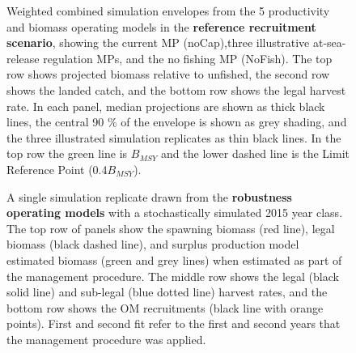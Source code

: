\documentclass[11pt]{book}
\begin{document}
\begin{landscape}
\begin{figure}[htb]
{}

\caption{Weighted combined simulation envelopes from the 5 productivity and biomass operating models in the \textbf{reference recruitment scenario}, showing the current MP (noCap),three illustrative at-sea-release regulation MPs, and the no fishing MP (NoFish). The top row shows projected biomass relative to unfished, the second row shows the landed catch, and the bottom row shows the legal harvest rate. In each panel, median projections are shown as thick black lines, the central 90 \% of the envelope is shown as grey shading, and the three illustrated simulation replicates as thin black lines. In the top row the green line is $B_{MSY}$ and the lower dashed line is the Limit Reference Point (0.4$B_{MSY}$).}\label{fig:unnamed-chunk-24}
\end{figure}
\newpage
\begin{figure}[htb]

{\centering {} 

}

\caption{A single simulation replicate drawn from the \textbf{robustness operating models} with a stochastically simulated 2015 year class. The top row of panels show the spawning biomass (red line), legal biomass (black dashed line), and surplus production model estimated biomass (green and grey lines) when estimated as part of the management procedure. The middle row shows the legal (black solid line) and sub-legal (blue dotted line) harvest rates, and the bottom row shows the OM recruitments (black line with orange points). First and second fit refer to the first and second years that the management procedure was applied.}\label{fig:unnamed-chunk-25}
\end{figure}
\newpage
\begin{figure}[htb]


\end{figure}
\end{landscape}
\end{document}
